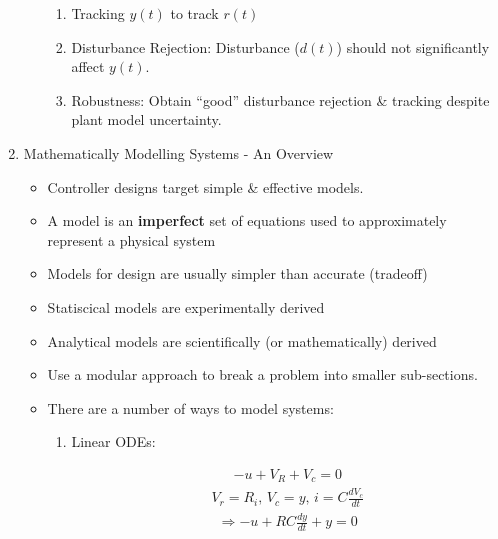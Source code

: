 \begin{enumerate}
\begin{enumerate}
                \begin{enumerate}
                    \item Tracking $y(t)$ to track $r(t)$
                    \item Disturbance Rejection: Disturbance ($d(t)$) should not significantly affect $y(t)$.
                    \item Robustness: Obtain ``good'' disturbance rejection \& tracking despite plant model uncertainty.
                \end{enumerate}
        \end{enumerate}
    \item Mathematically Modelling Systems - An Overview
        \begin{itemize}
            \item Controller designs target simple \& effective models.

            \item A model is an {\bf imperfect} set of equations used to approximately represent a physical system

            \item Models for design are usually simpler than accurate (tradeoff)

            \item Statiscical models are experimentally derived

            \item Analytical models are scientifically (or mathematically) derived

            \item Use a modular approach to break a problem into smaller sub-sections.

            \item There are a number of ways to model systems:

            \begin{enumerate}
                \item Linear ODEs:

                    \begin{align*} -u + V_R + V_c = 0 \end{align*}
                    \begin{align*} V_r = R_i \text{, } V_c = y \text{, } i = C\frac{d{V_c}}{dt} \end{align*}
                    \begin{align*} \Rightarrow -u + RC \frac{dy}{dt} + y = 0\end{align*}


\end{enumerate}
\end{itemize}
\end{enumerate}
